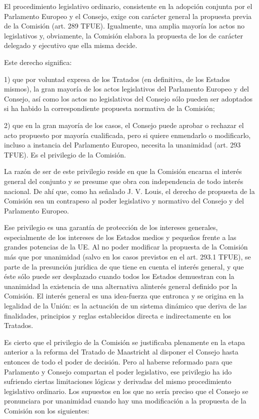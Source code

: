 \documentclass[10pt,a4paper]{article}
\begin{document}
El procedimiento legislativo ordinario, consistente en la adopción conjunta por el Parlamento Europeo y el Consejo, exige con carácter general la propuesta previa de la Comisión (art. 289 TFUE). Igualmente, una amplia mayoría los actos no legislativos y, obviamente, la Comisión elabora la propuesta de los de carácter delegado y ejecutivo que ella misma decide.

Este derecho significa:

1) que por voluntad expresa de los Tratados (en definitiva, de los Estados mismos), la gran mayoría de los actos legislativos del Parlamento Europeo y del Consejo, así como los actos no legislativos del Consejo sólo pueden ser adoptados si ha habido la correspondiente propuesta normativa de la Comisión;

2) que en la gran mayoría de los casos, el Consejo puede aprobar o rechazar el acto propuesto por mayoría cualificada, pero si quiere enmendarlo o modificarlo, incluso a instancia del Parlamento Europeo, necesita la unanimidad (art. 293 TFUE). Es el privilegio de la Comisión.

La razón de ser de este privilegio reside en que la Comisión encarna el interés general del conjunto y se presume que obra con independencia de todo interés nacional. De ahí que, como ha señalado J. V. Louis, el derecho de propuesta de la Comisión sea un contrapeso al poder legislativo y normativo del Consejo y del Parlamento Europeo.

Ese privilegio es una garantía de protección de los intereses generales, especialmente de los intereses de los Estados medios y pequeños frente a las grandes potencias de la UE. Al no poder modificar la propuesta de la Comisión más que por unanimidad (salvo en los casos previstos en el art. 293.1 TFUE), se parte de la presunción jurídica de que tiene en cuenta el interés general, y que éste sólo puede ser desplazado cuando todos los Estados demuestran con la unanimidad la existencia de una alternativa alinterés general definido por la Comisión. El interés general es una idea-fuerza que entronca y se origina en la legalidad de la Unión: es la actuación de un sistema dinámico que deriva de las finalidades, principios y reglas establecidos directa e indirectamente en los Tratados.

Es cierto que el privilegio de la Comisión se justificaba plenamente en la etapa anterior a la reforma del Tratado de Maastricht al disponer el Consejo hasta entonces de todo el poder de decisión. Pero al haberse reformado para que Parlamento y Consejo compartan el poder legislativo, ese privilegio ha ido sufriendo ciertas limitaciones lógicas y derivadas del mismo procedimiento legislativo ordinario. Los supuestos en los que no sería preciso que el Consejo se pronunciara por unanimidad cuando hay una modificación a la propuesta de la Comisión son los siguientes:
\end{document}
